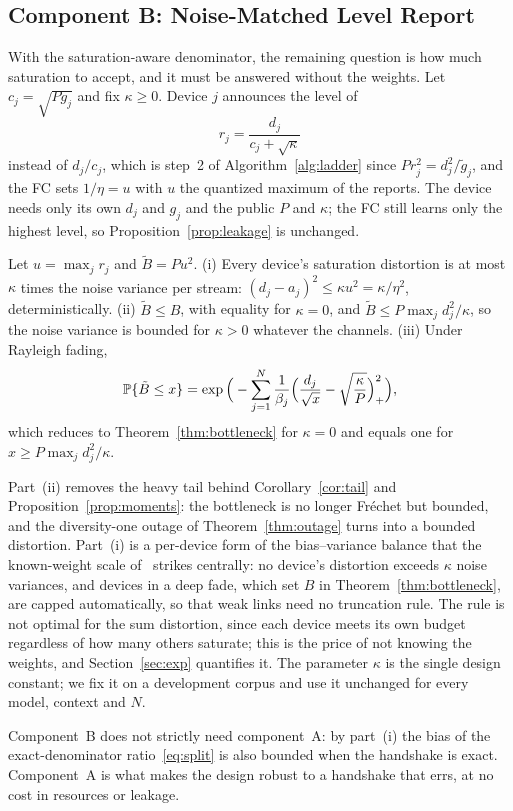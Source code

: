 \subsection{Component B: Noise-Matched Level Report}

With the saturation-aware denominator, the remaining question is how much saturation to accept, and it must be answered without the weights. Let $c_j=\sqrt{Pg_j}$ and fix $\kappa\ge0$. Device $j$ announces the level of
\begin{equation}
r_j=\frac{d_j}{c_j+\sqrt\kappa}
\label{eq:kappa_report}
\end{equation}
instead of $d_j/c_j$, which is step~2 of Algorithm~\ref{alg:ladder} since $Pr_j^2=d_j^2/\tilde g_j$, and the FC sets $1/\eta=u$ with $u$ the quantized maximum of the reports. The device needs only its own $d_j$ and $g_j$ and the public $P$ and $\kappa$; the FC still learns only the highest level, so Proposition~\ref{prop:leakage} is unchanged.

\begin{proposition}\label{prop:kappa}
Let $u=\max_jr_j$ and $\tilde B=Pu^2$. (i) Every device's saturation distortion is at most $\kappa$ times the noise variance per stream: $(d_j-a_j)^2\le\kappa u^2=\kappa/\eta^2$, deterministically. (ii) $\tilde B\le B$, with equality for $\kappa=0$, and $\tilde B\le P\max_jd_j^2/\kappa$, so the noise variance is bounded for $\kappa>0$ whatever the channels. (iii) Under Rayleigh fading,
\begin{equation}
\mathbb{P}\{\tilde B\le x\}=\exp\Big(-\sum_{j=1}^N\frac{1}{\beta_j}\Big(\frac{d_j}{\sqrt x}-\sqrt{\frac{\kappa}{P}}\Big)_+^2\Big),
\label{eq:kappa_law}
\end{equation}
which reduces to Theorem~\ref{thm:bottleneck} for $\kappa=0$ and equals one for $x\ge P\max_jd_j^2/\kappa$.
\end{proposition}

Part~(ii) removes the heavy tail behind Corollary~\ref{cor:tail} and Proposition~\ref{prop:moments}: the bottleneck is no longer Fr\'echet but bounded, and the diversity-one outage of Theorem~\ref{thm:outage} turns into a bounded distortion. Part~(i) is a per-device form of the bias--variance balance that the known-weight scale of~\cite{yang2026airmoe} strikes centrally: no device's distortion exceeds $\kappa$ noise variances, and devices in a deep fade, which set $B$ in Theorem~\ref{thm:bottleneck}, are capped automatically, so that weak links need no truncation rule. The rule is not optimal for the sum distortion, since each device meets its own budget regardless of how many others saturate; this is the price of not knowing the weights, and Section~\ref{sec:exp} quantifies it. The parameter $\kappa$ is the single design constant; we fix it on a development corpus and use it unchanged for every model, context and $N$.

Component~B does not strictly need component~A: by part~(i) the bias of the exact-denominator ratio~\eqref{eq:split} is also bounded when the handshake is exact. Component~A is what makes the design robust to a handshake that errs, at no cost in resources or leakage.
